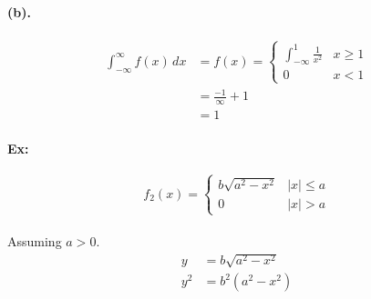 \documentclass{article}
\begin{document}
\begin{enumerate}
        \paragraph{(b).}

        \begin{align*}
            \int_{-\infty}^{\infty} f(x)\,dx &= 
            f(x) = \begin{cases}
                \int_{-\infty}^{1} \frac{1}{x^2}& x \ge 1 \\
                0 & x < 1
                \end{cases}\\
                                             &= \frac{-1}{\infty} + 1\\
                                             &= 1
        \end{align*}
        \paragraph{Ex:} 
        \[ f_2(x) = \begin{cases}
            b\sqrt{a^2 - x^2} & \lvert x \rvert \le a \\
            0 & \lvert x \rvert > a
            \end{cases}
        \]
        \paragraph{} Assuming $a > 0$.
        \begin{align*}
            y &= b\sqrt{a^2 - x^2} \\
            y^2  &= b^2(a^2 - x^2)
        \end{align*}

\end{enumerate}
\end{document}
